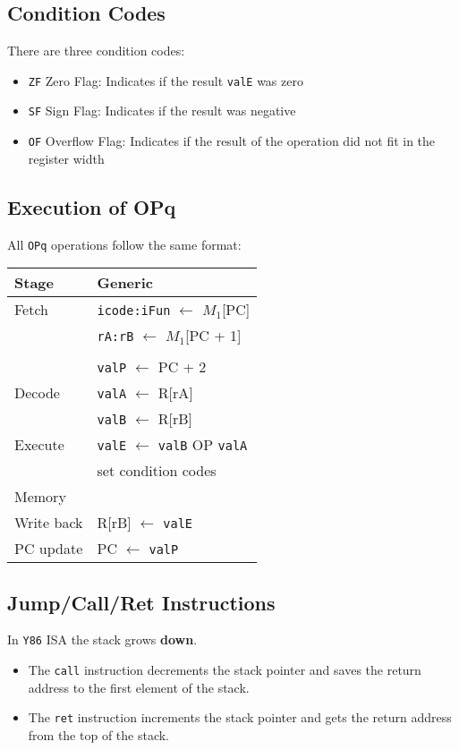 \documentclass[a4paper]{article}
\newcommand{\code}[1]{\texttt{#1}}
\begin{document}
\subsection{Condition Codes}
There are three condition codes:

\begin{itemize}
    \item \code{ZF} Zero Flag: Indicates if the result \code{valE} was zero
    \item \code{SF} Sign Flag: Indicates if the result was negative
    \item \code{OF} Overflow Flag: Indicates if the result of the operation did not fit in the register width
\end{itemize}

\subsection{Execution of OPq}
All \code{OPq} operations follow the same format:

\begin{center}
    \begin{tabular}{l l}
        Stage & Generic \\
        \hline
        Fetch & \code{icode:iFun} $\leftarrow$ $M_1$[PC]\\
            & \code{rA:rB} $\leftarrow$ $M_1$[PC + 1]\\
            & \\
            & \code{valP} $\leftarrow$ PC + 2\\
        Decode & \code{valA} $\leftarrow$ R[rA]\\
            & \code{valB} $\leftarrow$ R[rB]\\
        Execute & \code{valE} $\leftarrow$ \code{valB} OP \code{valA}\\
                & set condition codes \\
        Memory & \\
        Write back & R[rB] $\leftarrow$ \code{valE}\\
        PC update & PC $\leftarrow$ \code{valP}
    \end{tabular}
\end{center}

\subsection{Jump/Call/Ret Instructions}
In \code{Y86} ISA the stack grows \textbf{down}. 
\begin{itemize}
    \item The \code{call} instruction decrements the stack pointer and saves the return address to the first element of the stack.
    \item The \code{ret} instruction increments the stack pointer and gets the return address from the top of the stack.
\end{itemize}
\end{document}
